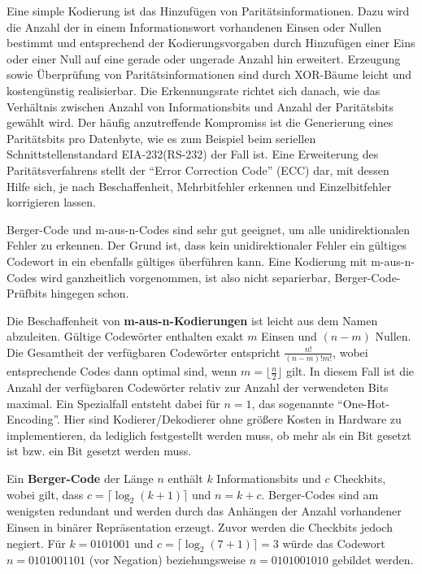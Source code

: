 Eine simple Kodierung ist das Hinzufügen von
Paritätsinformationen. Dazu wird die Anzahl der in einem
Informationswort vorhandenen Einsen oder Nullen bestimmt und
entsprechend der Kodierungsvorgaben durch Hinzufügen einer Eins oder
einer Null auf eine gerade oder ungerade Anzahl hin
erweitert. Erzeugung sowie Überprüfung von Paritätsinformationen sind
durch XOR-Bäume leicht und kostengünstig realisierbar. Die
Erkennungsrate richtet sich danach, wie das Verhältnis zwischen Anzahl
von Informationsbits und Anzahl der Paritätsbits gewählt wird. Der
häufig anzutreffende Kompromiss ist die Generierung eines Paritätsbits
pro Datenbyte, wie es zum Beispiel beim seriellen
Schnittstellenstandard EIA-232(RS-232) der Fall ist.
Eine Erweiterung des Paritätsverfahrens stellt der ``Error Correction
Code'' (ECC) dar, mit dessen Hilfe sich, je nach Beschaffenheit,
Mehrbitfehler erkennen und Einzelbitfehler korrigieren lassen.

Berger-Code und m-aus-n-Codes sind sehr gut geeignet, um alle
unidirektionalen Fehler zu erkennen. Der Grund ist, dass kein
unidirektionaler Fehler ein gültiges Codewort in ein ebenfalls
gültiges überführen kann. Eine Kodierung mit m-aus-n-Codes wird
ganzheitlich vorgenommen, ist also nicht separierbar,
Berger-Code-Prüfbits hingegen schon.

Die Beschaffenheit von \textbf{m-aus-n-Kodierungen} ist leicht aus dem
Namen abzuleiten. Gültige Codewörter enthalten exakt $m$ Einsen und
$(n-m)$ Nullen. Die Gesamtheit der verfügbaren Codewörter entspricht
$\frac{n!}{(n-m)!m!}$, wobei entsprechende Codes dann optimal sind,
wenn $m=\lfloor\frac{n}{2}\rfloor$ gilt. In diesem Fall ist die Anzahl
der verfügbaren Codewörter relativ zur Anzahl der verwendeten Bits maximal. Ein Spezialfall entsteht dabei für
$n=1$, das sogenannte ``One-Hot-Encoding''. Hier sind Kodierer/Dekodierer ohne größere Kosten in Hardware zu implementieren, da lediglich festgestellt werden muss, ob mehr als ein Bit gesetzt ist bzw. ein Bit gesetzt werden muss.

Ein \textbf{Berger-Code} der Länge $n$ enthält $k$ Informationsbits
und $c$ Checkbits, wobei gilt, dass $c=\lceil \log_2(k+1)  \rceil$ und
$n=k+c$. Berger-Codes sind am wenigsten redundant und werden durch das
Anhängen der Anzahl vorhandener Einsen in binärer Repräsentation
erzeugt. Zuvor werden die Checkbits jedoch negiert. Für $k=0101001$
und $c=\lceil \log_2(7+1)  \rceil = 3$ würde das Codewort
$n=0101001101$ (vor Negation) beziehungsweise $n=0101001010$ gebildet
werden.

